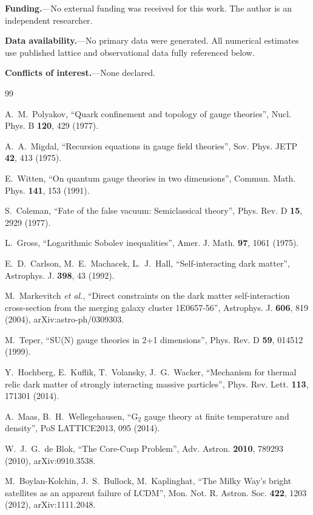 \documentclass[aps,prd,twocolumn,nofootinbib,superscriptaddress,floatfix]{revtex4-2}
\begin{document}
\textbf{Funding.}---No external funding was received for this work. The author is an independent researcher.

\textbf{Data availability.}---No primary data were generated. All numerical estimates use published lattice and observational data fully referenced below.

\textbf{Conflicts of interest.}---None declared.

\begin{thebibliography}{99}

 A.~M.~Polyakov, ``Quark confinement and topology of gauge theories'', Nucl. Phys. B \textbf{120}, 429 (1977).

 A.~A.~Migdal, ``Recursion equations in gauge field theories'', Sov. Phys. JETP \textbf{42}, 413 (1975).

 E.~Witten, ``On quantum gauge theories in two dimensions'', Commun. Math. Phys. \textbf{141}, 153 (1991).

 S.~Coleman, ``Fate of the false vacuum: Semiclassical theory'', Phys. Rev. D \textbf{15}, 2929 (1977).

 L.~Gross, ``Logarithmic Sobolev inequalities'', Amer. J. Math. \textbf{97}, 1061 (1975).

 E.~D.~Carlson, M.~E.~Machacek, L.~J.~Hall, ``Self-interacting dark matter'', Astrophys. J. \textbf{398}, 43 (1992).

 M.~Markevitch \emph{et al.}, ``Direct constraints on the dark matter self-interaction cross-section from the merging galaxy cluster 1E0657-56'', Astrophys. J. \textbf{606}, 819 (2004), arXiv:astro-ph/0309303.

 M.~Teper, ``SU(N) gauge theories in 2+1 dimensions'', Phys. Rev. D \textbf{59}, 014512 (1999).

 Y.~Hochberg, E.~Kuflik, T.~Volansky, J.~G.~Wacker, ``Mechanism for thermal relic dark matter of strongly interacting massive particles'', Phys. Rev. Lett. \textbf{113}, 171301 (2014).

 A.~Maas, B.~H.~Wellegehausen, ``G$_2$ gauge theory at finite temperature and density'', PoS LATTICE2013, 095 (2014).

 W.~J.~G.~de Blok, ``The Core-Cusp Problem'', Adv. Astron. \textbf{2010}, 789293 (2010), arXiv:0910.3538.

 M.~Boylan-Kolchin, J.~S.~Bullock, M.~Kaplinghat, ``The Milky Way's bright satellites as an apparent failure of LCDM'', Mon. Not. R. Astron. Soc. \textbf{422}, 1203 (2012), arXiv:1111.2048.


\end{thebibliography}
\end{document}
